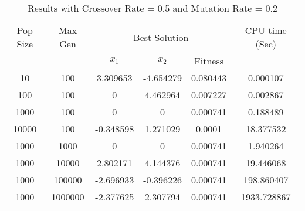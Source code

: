 \documentclass[12pt]{article}
\begin{document}
	\begin{table}[h!]
		\caption{Results with Crossover Rate = 0.5 and Mutation Rate = 0.2}
		\label{table:1}
		\centering
		\begin{tabular}{c c c c c c}
			\hline
			Pop Size & Max Gen & \multicolumn{3}{c}{Best Solution} & CPU time (Sec) \\
			& & $x_1$ & $x_2$ & Fitness & \\
			\hline
			10  & 100    & 3.309653 & -4.654279 & 0.080443 & 0.000107\\
			100 & 100    & 0 & 4.462964 & 0.007227 & 0.002867\\
			1000& 100    & 0 & 0 & 0.000741 & 0.188489\\
			10000& 100    & -0.348598 & 1.271029  & 0.0001 & 18.377532\\
			\hline
			1000  & 1000   & 0 & 0 & 0.000741 & 1.940264\\
			1000 & 10000  & 2.802171 & 4.144376 & 0.000741 & 19.446068\\
			1000& 100000 & -2.696933 & -0.396226  & 0.000741 & 198.860407\\
			1000& 1000000 & -2.377625 & 2.307794  & 0.000741 & 1933.728867\\
			\hline
		\end{tabular}
	\end{table}
	
	
\end{document}
